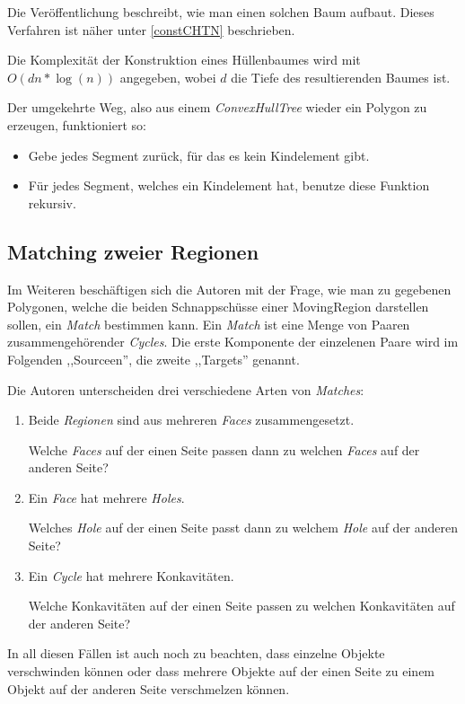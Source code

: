 Die Veröffentlichung beschreibt, wie man einen solchen Baum aufbaut. Dieses Verfahren ist näher unter \vref{constCHTN} beschrieben.

Die Komplexität der Konstruktion eines Hüllenbaumes wird mit $O(dn*\log(n))$ angegeben, wobei $d$ die Tiefe des resultierenden Baumes ist.

Der umgekehrte Weg, also aus einem \textit{ConvexHullTree} wieder ein Polygon zu erzeugen, funktioniert so:

\begin{itemize}
\item Gebe jedes Segment zurück, für das es kein Kindelement gibt.
\item Für jedes Segment, welches ein Kindelement hat, benutze diese Funktion rekursiv.
\end{itemize}

\subsection{Matching zweier Regionen}

Im Weiteren beschäftigen sich die Autoren mit der Frage, wie man zu gegebenen Polygonen, welche die beiden Schnappschüsse einer MovingRegion darstellen sollen, ein \textit{Match} bestimmen kann. Ein \textit{Match} ist eine Menge von Paaren zusammengehörender \textit{Cycles}. Die erste Komponente der einzelenen Paare wird im Folgenden ,,Sourceen'', die zweite ,,Targets'' genannt.

Die Autoren unterscheiden drei verschiedene Arten von \textit{Matches}:

\begin{enumerate}
\item Beide \textit{Regionen} sind aus mehreren \textit{Faces} zusammengesetzt.
 
Welche \textit{Faces} auf der einen Seite passen dann zu welchen \textit{Faces} auf der anderen Seite?
\item Ein \textit{Face} hat mehrere \textit{Holes}.
 
Welches \textit{Hole} auf der einen Seite passt dann zu welchem \textit{Hole} auf der anderen Seite?
\item Ein \textit{Cycle} hat mehrere Konkavitäten.
 
Welche Konkavitäten auf der einen Seite passen zu welchen Konkavitäten auf der anderen Seite?
\end{enumerate}

In all diesen Fällen ist auch noch zu beachten, dass einzelne Objekte verschwinden können oder dass mehrere Objekte auf der einen Seite zu einem Objekt auf der anderen Seite verschmelzen können.

